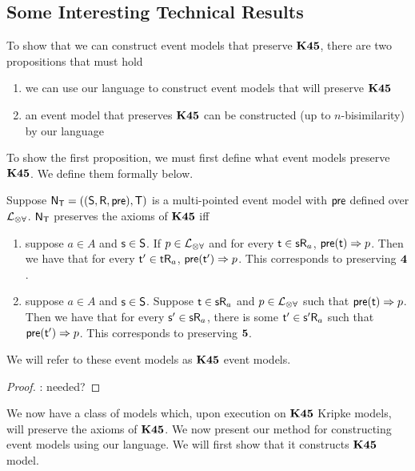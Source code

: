 \subsection{Some Interesting Technical Results}

To show that we can construct event models that preserve $\bf K45$, there are two propositions that
must hold
\begin{enumerate}
	\item we can use our language to construct event models that will preserve $\bf K45$
	\item an event model that preserves $\bf K45$ can be constructed (up to $n$-bisimilarity) by our
		language
\end{enumerate}

To show the first proposition, we must first define what event models preserve $\bf K45$.
We define them formally below.

\begin{lemma} \label{k45EventModel}
	Suppose $\mathrm{\mathsf{N}}_\mathrm{\mathsf{T}} = ((\mathrm{\mathsf{S}},\mathrm{\mathsf{R}},\mathrm{\mathsf{pre}}),\mathrm{\mathsf{T}})$ is a multi-pointed event model with $\mathrm{\mathsf{pre}}$
	defined over $\mathcal{L}_{\otimes\forall}$.
	$\mathrm{\mathsf{N}}_\mathrm{\mathsf{T}}$ preserves the axioms of $\bf K45$ iff
	\begin{enumerate}
		\item \label{k45EventModelConFour} suppose $a \in A$ and $\mathrm{\mathsf{s}} \in \mathrm{\mathsf{S}}$.
			If $p \in \mathcal{L}_{\otimes\forall}$ and for every $\mathrm{\mathsf{t}} \in \mathrm{\mathsf{s}} \mathrm{\mathsf{R}}_a$, $\mathrm{\mathsf{pre}}(\mathrm{\mathsf{t}}) \Rightarrow p$.
			Then we have that for every $\mathrm{\mathsf{t}}' \in \mathrm{\mathsf{t}} \mathrm{\mathsf{R}}_a$,
			$\mathrm{\mathsf{pre}}(\mathrm{\mathsf{t}}') \Rightarrow p$.
			This corresponds to preserving $\bf 4$.
		\item \label{k45EventModelConFive} suppose $a \in A$ and $\mathrm{\mathsf{s}} \in \mathrm{\mathsf{S}}$.
			Suppose $\mathrm{\mathsf{t}} \in \mathrm{\mathsf{s}} \mathrm{\mathsf{R}}_a$ and $p \in \mathcal{L}_{\otimes\forall}$ such that $\mathrm{\mathsf{pre}}(\mathrm{\mathsf{t}}) \Rightarrow p$.
			Then we have that for every $\mathrm{\mathsf{s}}' \in \mathrm{\mathsf{s}} \mathrm{\mathsf{R}}_a$, there is some $\mathrm{\mathsf{t}}' \in \mathrm{\mathsf{s}}' \mathrm{\mathsf{R}}_a$
			such that $\mathrm{\mathsf{pre}}(\mathrm{\mathsf{t}}') \Rightarrow p$.
			This corresponds to preserving $\bf 5$.
	\end{enumerate}
	We will refer to these event models as $\bf K45$ event models.
\end{lemma}
\begin{proof}
	\FIXME: needed?
\end{proof}

We now have a class of models which, upon execution on $\bf K45$ Kripke models, will preserve the
axioms of $\bf K45$.
We now present our method for constructing event models using our language.
We will first show that it constructs $\bf K45$ model.

